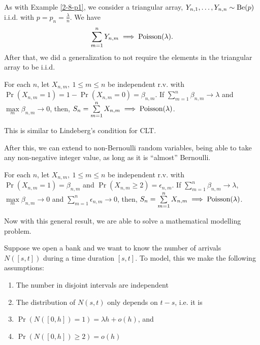 \documentclass[../main/main.tex]{subfiles}
\begin{document}
As with Example \ref{2-8-p1}, we consider a triangular array, $Y_{n,1}, \ldots , Y_{n,n}\sim\text{Be}(p)$ i.i.d. with $p=p_n = \frac{\lambda}{n}$. We have \[
	\sum\limits_{m=1}^{n}Y_{n , m } \implies \text{Poisson}(\lambda) .
\]
After that, we did a generalization to not require the elements in the triangular array to be i.i.d.
\begin{theorem}
	For each $n$, let $X_{n,m},~ 1 \leq m \leq n$ be independent r.v. with $\Pr(X_{n,m}=1)=1-\Pr(X_{n,m}=0)= \beta_{n,m}$. If $\sum\limits_{m=1}^{n} \beta_{n,m} \to \lambda$ and $\max\limits_{m} \beta_{n,m} \to 0$,
	then, $S_n = \sum\limits_{m=1}^{n}X_{n,m} \implies \text{Poisson}(\lambda)$.
\end{theorem}
\begin{remark}
	This is similar to Lindeberg's condition for CLT.
\end{remark}

After this, we can extend to non-Bernoulli random variables, being able to take any non-negative integer value, as long as it is ``almost'' Bernoulli.

\begin{theorem}
	For each $n$, let $X_{n,m},~ 1 \leq m \leq n$ be independent r.v. with $\Pr(X_{n,m}=1)= \beta_{n,m}$ and $\Pr(X_{n,m} \geq 2)= \epsilon_{n,m}$. If $\sum\limits_{m=1}^{n} \beta_{n,m} \to \lambda$, $\max\limits_{m} \beta_{n,m} \to 0$ and \(\sum\limits_{m=1}^{n}\epsilon_{n,m} \to 0\),
	then, $S_n = \sum\limits_{m=1}^{n}X_{n,m} \implies \text{Poisson}(\lambda)$.
\end{theorem}

Now with this general result, we are able to solve a mathematical modelling problem.

\begin{example}\label{28-p2}
	Suppose we open a bank and we want to know the number of arrivals $N([s,t])$ during a time duration $[s,t]$. To model, this we make the following assumptions:
	\begin{enumerate}[label=(\roman*)]
		\item  The number in disjoint intervals are independent
		\item The distribution of $N(s,t)$ only depends on $t-s$, i.e. it is 
		\item $\Pr(N([0,h])=1) = \lambda h + o(h)$, and
		\item $\Pr(N([0,h])\geq 2) = o(h)$
	\end{enumerate}
\end{example}
\end{document}
